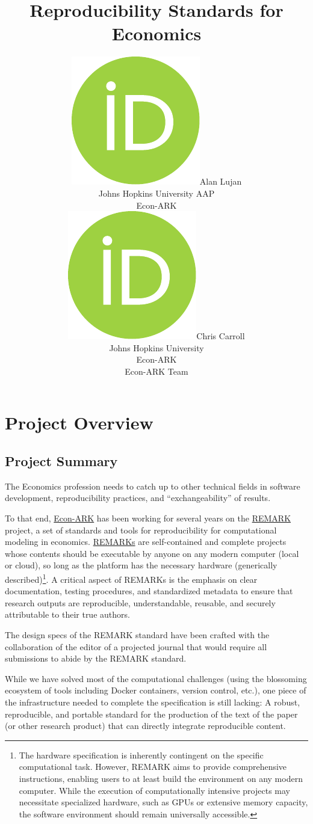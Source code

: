 \documentclass{article}
\title{Reproducibility Standards for Economics}
\date{\displaydate{articleDate}}
\author{\href{https://orcid.org/0000-0002-5289-7054}{\includegraphics[scale=0.06]{orcid.pdf}}\hspace{1mm}Alan Lujan\footnotemark[1]\\
Johns Hopkins University AAP\\Econ-ARK\\\AND
\href{https://orcid.org/0000-0003-3732-9312}{\includegraphics[scale=0.06]{orcid.pdf}}\hspace{1mm}Chris Carroll\\
Johns Hopkins University\\Econ-ARK\\\AND
Econ-ARK Team\\
}
\begin{document}
\maketitle
{}



\section{Project Overview}

\subsection{Project Summary}


The Economics profession needs to catch up to other technical fields in software development, reproducibility practices, and ``exchangeability'' of results.

To that end, \href{https://econ-ark.org}{Econ-ARK} has been working for several years on the \href{https://github.com/econ-ark/REMARK}{REMARK} project, a set of standards and tools for reproducibility for computational modeling in economics. \href{https://econ-ark.org/materials/}{REMARKs} are self-contained and complete projects whose contents should be executable by anyone on any modern computer (local or cloud), so long as the platform has the necessary hardware (generically described)\footnote{The hardware specification is inherently contingent on the specific computational task. However, REMARK aims to provide comprehensive instructions, enabling users to at least build the environment on any modern computer. While the execution of computationally intensive projects may necessitate specialized hardware, such as GPUs or extensive memory capacity, the software environment should remain universally accessible.}. A critical aspect of REMARKs is the emphasis on clear documentation, testing procedures, and standardized metadata to ensure that research outputs are reproducible, understandable, reusable, and securely attributable to their true authors.

The design specs of the REMARK standard have been crafted with the collaboration of the editor of a projected journal that would require all submissions to abide by the REMARK standard.

While we have solved most of the computational challenges (using the blossoming ecosystem of tools including Docker containers, version control, etc.), one piece of the infrastructure needed to complete the specification is still lacking: A robust, reproducible, and portable standard for the production of the text of the paper (or other research product) that can directly integrate reproducible content.
\end{document}
